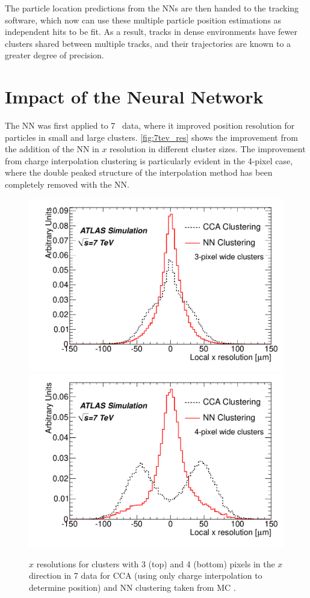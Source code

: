 The particle location predictions from the \acp{NN} are then handed to the tracking software, which now can use these multiple particle position estimations as independent hits to be fit. As a result, tracks in dense environments have fewer clusters shared between multiple tracks, and their trajectories are known to a greater degree of precision. 


\section{Impact of the Neural Network}

The \ac{NN} was first applied to 7 \tev~data, where it improved position resolution for particles in small and large clusters. \autoref{fig:7tev_res} shows the improvement from the addition of the \ac{NN} in $x$ resolution in different cluster sizes. The improvement from charge interpolation clustering is particularly evident in the 4-pixel case, where the double peaked structure of the interpolation method has been completely removed with the \ac{NN}.  

\begin{centering}
\begin{figure}[!htb]
\myfloatalign
\includegraphics[width=.9\linewidth]{figures/nn/3x_res.pdf}
\includegraphics[width=.9\linewidth]{figures/nn/4x_res.pdf}
\caption{$x$ resolutions for clusters with 3 (top) and 4 (bottom) pixels in the $x$ direction in 7 \tev data for \ac{CCA} (using only charge interpolation to determine position) and \ac{NN} clustering taken from \ac{MC} \cite{PERF-2012-05}.}
\label{fig:7tev_res}
\end{figure}
\end{centering}

